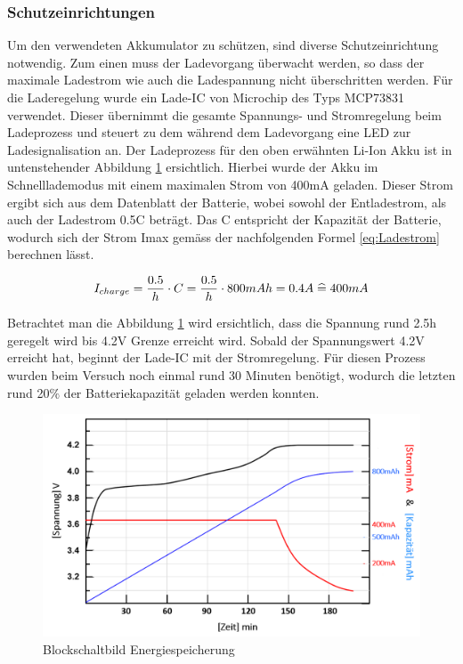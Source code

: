 \subsubsection*{Schutzeinrichtungen}\label{sec:schutzeinrichtung}
Um den verwendeten Akkumulator zu schützen, sind diverse Schutzeinrichtung notwendig. Zum einen muss der Ladevorgang überwacht werden, so dass der maximale Ladestrom wie auch die Ladespannung nicht überschritten werden. Für die Laderegelung wurde ein Lade-IC von Microchip des Typs MCP73831 verwendet. Dieser übernimmt die gesamte Spannungs- und Stromregelung beim Ladeprozess und steuert zu dem während dem Ladevorgang eine LED zur Ladesignalisation an. Der Ladeprozess für den oben erwähnten Li-Ion Akku ist in untenstehender Abbildung  \ref{fig:Ladekurve Li-Ion Akku} ersichtlich. Hierbei wurde der Akku im Schnelllademodus mit einem maximalen Strom von 400mA geladen. Dieser Strom ergibt sich aus dem Datenblatt der Batterie, wobei sowohl der Entladestrom, als auch der Ladestrom 0.5C beträgt. Das C entspricht der Kapazität der Batterie, wodurch sich der Strom Imax gemäss der nachfolgenden Formel \ref{eq:Ladestrom} berechnen lässt.

\begin{equation}
\centering
I_{charge}={\frac{0.5}{h} \cdot C}={\frac{0.5}{h} \cdot 800mAh}=0.4A\thickspace \widehat {=} \thickspace 400mA
\label{eq:Ladestrom}
\end{equation}

Betrachtet man die Abbildung \ref{fig:Ladekurve Li-Ion Akku} wird ersichtlich, dass die Spannung rund 2.5h geregelt wird bis 4.2V Grenze erreicht wird. Sobald der Spannungswert 4.2V erreicht hat, beginnt der Lade-IC mit der Stromregelung. Für diesen Prozess wurden beim Versuch noch einmal rund 30 Minuten benötigt, wodurch die letzten rund 20$\%$ der Batteriekapazität geladen werden konnten.

\begin{figure}[H]
	\begin{center}
		\includegraphics[width=120mm]{data/LadekurveLiIon.png}
		\caption[Blockschaltbild Energiespeicherung]{Blockschaltbild Energiespeicherung} %
		\label{fig:Ladekurve Li-Ion Akku}
	\end{center}
\end{figure}


